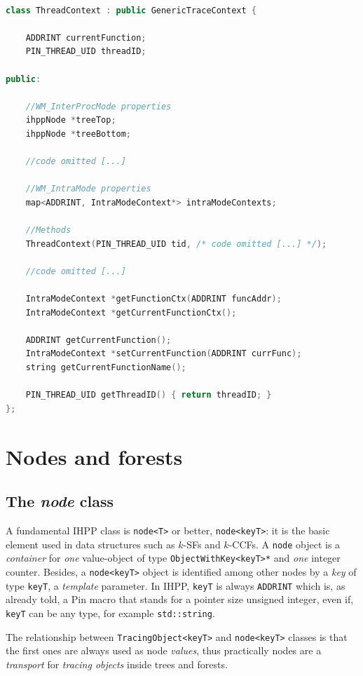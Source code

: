 \documentclass[a4paper,10pt]{report}
\begin{document}
\begin{lstlisting}[language=C++, 
	caption={partial definition of \texttt{ThreadContext} class}, 
	label=threadCtx, frame=leftline]

class ThreadContext : public GenericTraceContext {

	ADDRINT currentFunction;
	PIN_THREAD_UID threadID;

public:
	
	//WM_InterProcMode properties
	ihppNode *treeTop;
	ihppNode *treeBottom;

	//code omitted [...]

	//WM_IntraMode properties
	map<ADDRINT, IntraModeContext*> intraModeContexts;

	//Methods
	ThreadContext(PIN_THREAD_UID tid, /* code omitted [...] */);

	//code omitted [...]

	IntraModeContext *getFunctionCtx(ADDRINT funcAddr);
	IntraModeContext *getCurrentFunctionCtx();

	ADDRINT getCurrentFunction();
	IntraModeContext *setCurrentFunction(ADDRINT currFunc);
	string getCurrentFunctionName(); 

	PIN_THREAD_UID getThreadID() { return threadID; }
};

\end{lstlisting}

\section{Nodes and forests}

\subsection{The \emph{node} class}

A fundamental IHPP class is \verb|node<T>| or better, \verb|node<keyT>|:
it is the basic element used in data structures such as $k$-SFs and $k$-CCFs.
A \verb|node| object is a \emph{container} for \emph{one}
value-object of type \verb|ObjectWithKey<keyT>*| and \emph{one} integer counter. 
Besides, a \verb|node<keyT>| object is identified among other nodes by a
\emph{key} of type \verb|keyT|, a \emph{template} parameter. 
In IHPP, \verb|keyT| is always \verb|ADDRINT| which is, as already told, a Pin macro
that stands for a pointer size unsigned integer, even if, \verb|keyT| can be 
any type, for example \verb|std::string|.

The relationship between \verb|TracingObject<keyT>| and \verb|node<keyT>| classes is
that the first ones are always used as node \emph{values}, thus practically 
nodes are a \emph{transport} for \emph{tracing objects} inside trees and forests.
\end{document}
